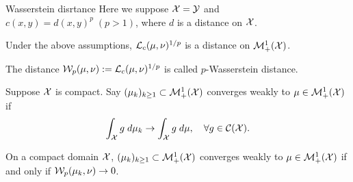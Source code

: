 \begin{frame}{Wasserstein disrtance}
    \footnotesize
    Here we suppose $\mathcal{X}=\mathcal{Y}$ and $c(x,y)=d(x,y)^p\;(p>1)$, where $d$ is a distance on $\mathcal{X}$.

    \pause
    \begin{Thm}
        Under the above assumptions, $\mathcal{L}_c(\mu,\nu)^{1/p}$ is a distance on $\mathcal{M}_+^1(\mathcal{X})$.
    \end{Thm}

    The distance $\mathcal{W}_p(\mu,\nu):=\mathcal{L}_c(\mu,\nu)^{1/p}$ is called $p$-Wasserstein distance.

    \pause

    \begin{Def}
        Suppose $\mathcal{X}$ is compact. Say $(\mu_k)_{k\geq 1}\subset \mathcal{M}_+^1(\mathcal{X})$ converges
        weakly to $\mu\in\mathcal{M}_+^1(\mathcal{X})$ if
        \begin{equation}
            \int_{\mathcal{X}} g\;d\mu_k \to \int_{\mathcal{X}}g\;d\mu,\quad \forall g\in\mathcal{C}(\mathcal{X}).
        \end{equation}
    \end{Def}

    \begin{Thm}
        On a compact domain $\mathcal{X}$, $(\mu_k)_{k\geq 1}\subset \mathcal{M}_+^1(\mathcal{X})$ converges 
        weakly to $\mu\in\mathcal{M}_+^1(\mathcal{X})$ if and only if $\mathcal{W}_p(\mu_k,\nu)\to 0$.
    \end{Thm}
\end{frame}

